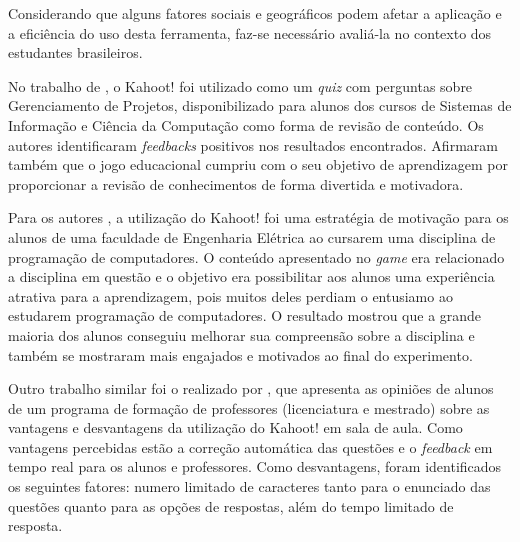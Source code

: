 \documentclass[
	12pt,				%
	openright,			%
	oneside,
	a4paper,			%
	english,			%
	french,				%
	spanish,			%
	brazil,				%
	]{abntex2}
\begin{document}

    
 Considerando que alguns fatores sociais e geográficos podem afetar a aplicação e a eficiência do uso desta ferramenta, faz-se necessário avaliá-la no contexto dos estudantes brasileiros.
 
 No trabalho de , o Kahoot! foi utilizado como um \textit{quiz} com perguntas sobre Gerenciamento de Projetos, disponibilizado para alunos dos cursos de Sistemas de
Informação e Ciência da Computação como forma de revisão de conteúdo. Os autores identificaram \textit{feedbacks} positivos nos resultados encontrados. Afirmaram também que o jogo educacional cumpriu com o seu objetivo de aprendizagem por proporcionar a revisão de conhecimentos de forma divertida e motivadora.

Para os autores , a utilização do Kahoot! foi uma estratégia de motivação para os alunos de uma faculdade de Engenharia Elétrica ao cursarem uma disciplina de programação de computadores. O conteúdo apresentado no \textit{game} era relacionado a disciplina em questão e o objetivo era possibilitar aos alunos uma experiência atrativa para a aprendizagem, pois muitos deles perdiam o entusiamo ao estudarem programação de computadores. O resultado mostrou que a grande maioria dos alunos conseguiu melhorar sua  compreensão sobre a disciplina e também se mostraram mais engajados e motivados ao final do experimento.

Outro trabalho similar foi o realizado por , que apresenta as opiniões de alunos de um programa de formação de professores (licenciatura e mestrado) sobre as vantagens e desvantagens da utilização do Kahoot! em sala de aula. Como vantagens percebidas estão a correção automática das questões e o \textit{feedback} em tempo real para os alunos e professores. Como desvantagens, foram identificados os seguintes fatores: numero limitado de caracteres tanto para o enunciado das questões quanto para as opções de respostas, além do tempo limitado de resposta.
\end{document}
